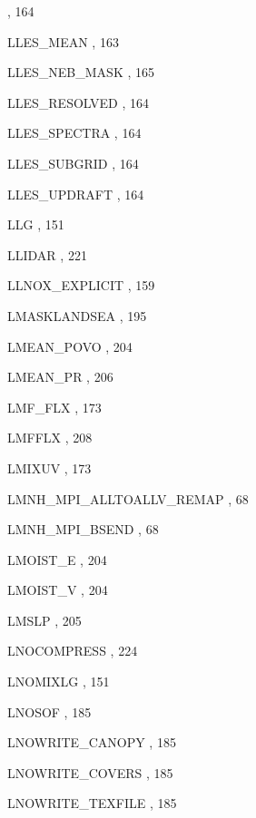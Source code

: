 \begin{theindex}
    \subitem {},  164
  \item LLES\_MEAN
    \subitem {},  163
  \item LLES\_NEB\_MASK
    \subitem {},  165
  \item LLES\_RESOLVED
    \subitem {},  164
  \item LLES\_SPECTRA
    \subitem {},  164
  \item LLES\_SUBGRID
    \subitem {},  164
  \item LLES\_UPDRAFT
    \subitem {},  164
  \item LLG
    \subitem {},  151
  \item LLIDAR
    \subitem {},  221
  \item LLNOX\_EXPLICIT
    \subitem {},  159
  \item LMASKLANDSEA
    \subitem {},  195
  \item LMEAN\_POVO
    \subitem {},  204
  \item LMEAN\_PR
    \subitem {},  206
  \item LMF\_FLX
    \subitem {},  173
  \item LMFFLX
    \subitem {},  208
  \item LMIXUV
    \subitem {},  173
  \item LMNH\_MPI\_ALLTOALLV\_REMAP
    \subitem {},  68
  \item LMNH\_MPI\_BSEND
    \subitem {},  68
  \item LMOIST\_E
    \subitem {},  204
  \item LMOIST\_V
    \subitem {},  204
  \item LMSLP
    \subitem {},  205
  \item LNOCOMPRESS
    \subitem {},  224
  \item LNOMIXLG
    \subitem {},  151
  \item LNOSOF
    \subitem {},  185
  \item LNOWRITE\_CANOPY
    \subitem {},  185
  \item LNOWRITE\_COVERS
    \subitem {},  185
  \item LNOWRITE\_TEXFILE
    \subitem {},  185

\end{theindex}
